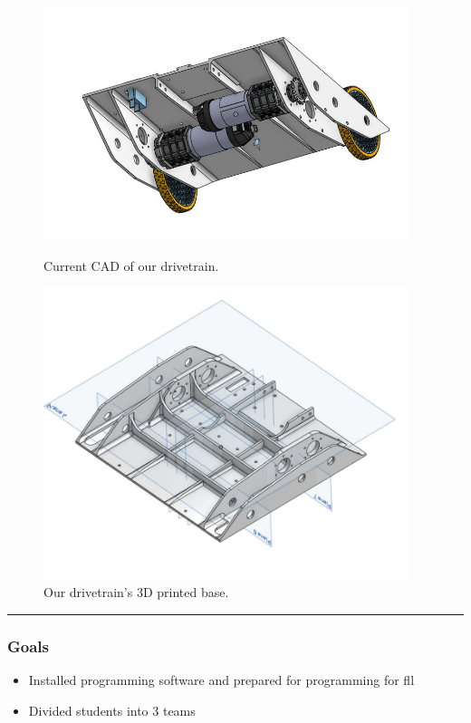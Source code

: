 \begin{figure}[ht]
\centering
\begin{minipage}[b]{.48\textwidth}
  \centering
  \includegraphics[width=0.95\textwidth]{Meetings/October/10-14-21/10-14-21_CAD_Figure1.JPG}
  \caption{Current CAD of our drivetrain.}
  \label{fig:101421_2}
\end{minipage}%
\hfill%
\begin{minipage}[b]{.48\textwidth}
  \centering
  \includegraphics[width=0.95\textwidth]{Meetings/October/10-14-21/10-14-21_CAD_Figure2.JPG}
  \caption{Our drivetrain's 3D printed base.}
  \label{fig:101421_3}
\end{minipage}
\end{figure}

\noindent\hfil\rule{\textwidth}{.4pt}\hfil
\subsubsection*{Goals}
\begin{itemize}
    \item Installed programming software and prepared for programming for fll
    \item Divided students into 3 teams
 
\end{itemize} 

